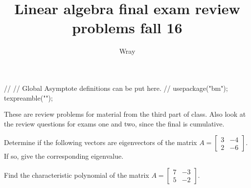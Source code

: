\documentclass[12pt]{exam}
\title{Linear algebra final exam review problems fall 16}
\author{Wray}
\begin{document}
\begin{asydef}
//
// Global Asymptote definitions can be put here.
//
usepackage("bm");
texpreamble("\def\V#1{\bm{#1}}");
\end{asydef}

\bigskip
\bigskip

These are review problems for material from the third part of class.  Also look at the review questions for exams one and two, since the final is cumulative.  
\bigskip

\begin{questions}

\question
Determine if the following vectors are eigenvectors of the matrix $A =
\left[ \begin{array}{cc}
3 & -4 \\ 2 & -6
\end{array}
\right]$.  If so, give the corresponding eigenvalue.

\begin{parts}
\end{parts}

\question
Find the characteristic polynomial of the matrix $A =
\left[ \begin{array}{cc}
7 & -3 \\ 5 & -2
\end{array}
\right]$.


\end{questions}
\end{document}
